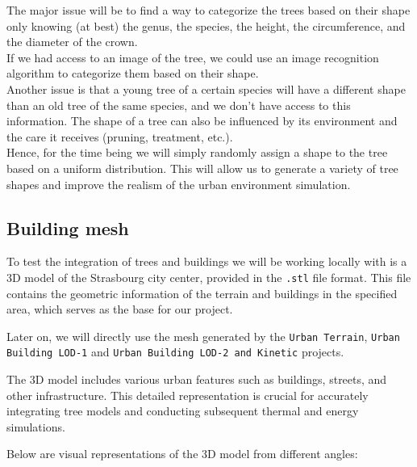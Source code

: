 \documentclass[12pt]{article}
\begin{document}
The major issue will be to find a way to categorize the trees based on their shape
only knowing (at best) the genus, the species, the height, the circumference, and
the diameter of the crown. \\
If we had access to an image of the tree, we could use an image recognition
algorithm to categorize them based on their shape. \\
Another issue is that a young tree of a certain species will have a different 
shape than an old tree of the same species, and we don't have access to this information.
 The shape of a tree can also be influenced by its environment and the care it 
 receives (pruning, treatment, etc.). \\

 Hence, for the time being we will simply randomly assign a shape to the tree
 based on a uniform distribution. This will allow us to generate a variety of
 tree shapes and improve the realism of the urban environment simulation.
\subsection{Building mesh}

To test the integration of trees and buildings we will be working locally with is a 3D 
model of the Strasbourg city
center, provided in the \texttt{.stl} file format. This file contains the
geometric information of the terrain and buildings in the specified area,
which serves as the base for our project.

Later on, we will directly use the mesh generated by the \texttt{Urban Terrain}, 
\texttt{Urban Building LOD-1} and \texttt{Urban Building LOD-2 and Kinetic} projects.

The 3D model includes various urban features such as buildings, streets, and
other infrastructure. This detailed representation is crucial for accurately
integrating tree models and conducting subsequent thermal and energy simulations.

Below are visual representations of the 3D model from different angles:
\end{document}
